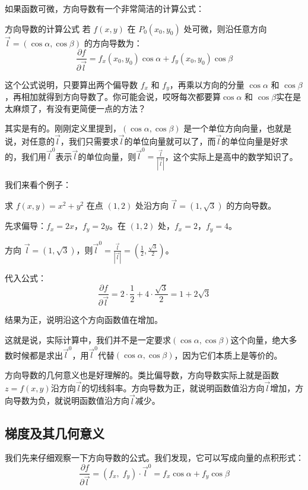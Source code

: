 如果函数可微，方向导数有一个非常简洁的计算公式：

\begin{theorem}{方向导数的计算公式}{}
若 $f(x, y)$ 在 $P_0(x_0, y_0)$ 处可微，则沿任意方向 $\vec{l} = (\cos\alpha, \cos\beta)$ 的方向导数为：
\[
\frac{\partial f}{\partial \vec{l}} = f_x(x_0, y_0)\cos\alpha + f_y(x_0, y_0)\cos\beta
\]
\end{theorem}

这个公式说明，只要算出两个偏导数 $f_x$ 和 $f_y$，再乘以方向的分量 $\cos\alpha$ 和 $\cos\beta$，再相加就得到方向导数了。你可能会说，哎呀每次都要算$\cos\alpha$ 和 $\cos\beta$实在是太麻烦了，有没有更简便一点的方法？

其实是有的。刚刚定义里提到，$ (\cos\alpha, \cos\beta)$ 是一个单位方向向量，也就是说，对任意的$\vec{l}$，我们只需要求$\vec{l}$的单位向量就可以了，而$\vec{l}$的单位向量是好求的，我们用$\vec{l}^0$表示$\vec{l}$的单位向量，则$\vec{l}^0=\frac{\vec{l}}{|\vec{l}|}$，这个实际上是高中的数学知识了。

我们来看个例子：

\begin{myexample}
  求 $f(x, y) = x^2 + y^2$ 在点 $(1, 2)$ 处沿方向 $\vec{l} = (1, \sqrt{3})$ 的方向导数。

  先求偏导：$f_x = 2x$，$f_y = 2y$。在 $(1, 2)$ 处，$f_x = 2$，$f_y = 4$。

  方向 $\vec{l} = (1, \sqrt{3})$，则$\vec{l}^0=\frac{\vec{l}}{|\vec{l}|}=(\frac{1}{2},\frac{\sqrt{3}}{2})$。

  代入公式：
  \[
  \frac{\partial f}{\partial \vec{l}} = 2 \cdot \frac{1}{2} + 4 \cdot \frac{\sqrt{3}}{2} = 1 + 2\sqrt{3}
  \]

  结果为正，说明沿这个方向函数值在增加。
\end{myexample}

这就是说，实际计算中，我们并不是一定要求$(\cos\alpha,\cos\beta)$这个向量，绝大多数时候都是求出$\vec{l}^0$，用$\vec{l}^0$代替$(\cos\alpha,\cos\beta)$，因为它们本质上是等价的。

方向导数的几何意义也是好理解的。类比偏导数，方向导数实际上就是函数$z=f(x,y)$沿方向$\vec{l}$的切线斜率。方向导数为正，就说明函数值沿方向$\vec{l}$增加，方向导数为负，就说明函数值沿方向$\vec{l}$减少。

\subsection{梯度及其几何意义}

我们先来仔细观察一下方向导数的公式。我们发现，它可以写成向量的点积形式：
\[
\frac{\partial f}{\partial \vec{l}} = (f_x,\; f_y) \cdot \vec{l}^0=f_x \cos\alpha + f_y \cos\beta
\]

